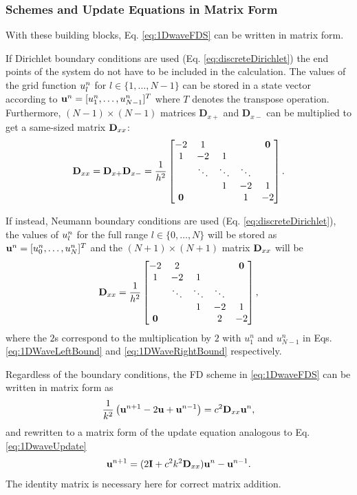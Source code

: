 \subsubsection{Schemes and Update Equations in Matrix Form}
With these building blocks, Eq. \eqref{eq:1DwaveFDS} can be written in matrix form.

If Dirichlet boundary conditions are used (Eq. \eqref{eq:discreteDirichlet}) the end points of the system do not have to be included in the calculation. The values of the grid function $u_l^n$ for $l\in \{1, \hdots, N-1\}$ can be stored in a state vector according to $\mathbf{u}^n = [u_1^n, \hdots, u_{N-1}^n]^T$ where $T$ denotes the transpose operation. Furthermore, $(N-1) \times (N-1)$ matrices $\mathbf{D}_{x+}$ and $\mathbf{D}_{x-}$ can be multiplied to get a same-sized matrix $\mathbf{D}_{xx}$:
\begin{equation}
    \mathbf{D}_{xx} = \mathbf{D}_{x+}\mathbf{D}_{x-} = \frac{1}{h^2}\begin{bmatrix}
        -2 & 1 & & &\mathbf{0}\\
        1 & -2 & 1 & & \\
        & \ddots & \ddots & \ddots & \\
        & & 1 & -2 & 1 \\
        \mathbf{0}& & & 1 & -2 
    \end{bmatrix}.
\end{equation}

If instead, Neumann boundary conditions are used (Eq. \eqref{eq:discreteDirichlet}), the values of $u_l^n$ for the full range $l\in \{0, \hdots, N\}$ will be stored as $\mathbf{u}^n=[u_0^n, \hdots, u_N^n]^T$ and the $(N+1) \times (N+1)$ matrix $\mathbf{D}_{xx}$ will be 
\begin{equation}
    \mathbf{D}_{xx} = \frac{1}{h^2}\begin{bmatrix}
        -2 & 2 & & &\mathbf{0}\\
        1 & -2 & 1 & & \\
        & \ddots & \ddots & \ddots & \\
        & & 1 & -2 & 1 \\
        \mathbf{0}& & & 2 & -2 
    \end{bmatrix},
\end{equation}
where the $2$s correspond to the multiplication by $2$ with $u_1^n$ and $u_{N-1}^n$ in Eqs. \eqref{eq:1DWaveLeftBound} and \eqref{eq:1DWaveRightBound} respectively.

Regardless of the boundary conditions, the FD scheme in \eqref{eq:1DwaveFDS} can be written in matrix form as
\begin{equation}\label{eq:1DwaveMatrix}
    \frac{1}{k^2}\left(\mathbf{u}^{n+1} - 2 \mathbf{u} + \mathbf{u}^{n-1}\right) = c^2 \mathbf{D}_{xx} \mathbf{u}^n,
\end{equation}
and rewritten to a matrix form of the update equation analogous to Eq. \eqref{eq:1DwaveUpdate}
\begin{equation}
    \mathbf{u}^{n+1} = (2\mathbf{I} + c^2k^2 \mathbf{D}_{xx} )\mathbf{u}^n - \mathbf{u}^{n-1}.
\end{equation}
The identity matrix is necessary here for correct matrix addition.

